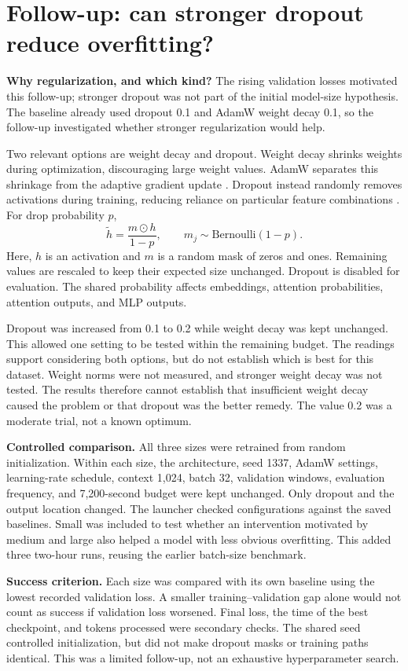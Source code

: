 \section{Follow-up: can stronger dropout reduce overfitting?}
\label{sec:dropoutdesign}
\textbf{Why regularization, and which kind?} The rising validation losses motivated this follow-up; stronger dropout was not part of the initial model-size hypothesis. The baseline already used dropout 0.1 and AdamW weight decay 0.1, so the follow-up investigated whether stronger regularization would help.

Two relevant options are weight decay and dropout. Weight decay shrinks weights during optimization, discouraging large weight values. AdamW separates this shrinkage from the adaptive gradient update \citep{loshchilov2019adamw}. Dropout instead randomly removes activations during training, reducing reliance on particular feature combinations \citep{srivastava2014dropout}. For drop probability $p$,
\begin{equation}
\widetilde h=\frac{m\odot h}{1-p},\qquad m_j\sim\mathrm{Bernoulli}(1-p).
\end{equation}
Here, $h$ is an activation and $m$ is a random mask of zeros and ones. Remaining values are rescaled to keep their expected size unchanged. Dropout is disabled for evaluation. The shared probability affects embeddings, attention probabilities, attention outputs, and MLP outputs.

Dropout was increased from 0.1 to 0.2 while weight decay was kept unchanged. This allowed one setting to be tested within the remaining budget. The readings support considering both options, but do not establish which is best for this dataset. Weight norms were not measured, and stronger weight decay was not tested. The results therefore cannot establish that insufficient weight decay caused the problem or that dropout was the better remedy. The value 0.2 was a moderate trial, not a known optimum.

\textbf{Controlled comparison.} All three sizes were retrained from random initialization. Within each size, the architecture, seed 1337, AdamW settings, learning-rate schedule, context 1,024, batch 32, validation windows, evaluation frequency, and 7,200-second budget were kept unchanged. Only dropout and the output location changed. The launcher checked configurations against the saved baselines. Small was included to test whether an intervention motivated by medium and large also helped a model with less obvious overfitting. This added three two-hour runs, reusing the earlier batch-size benchmark.

\textbf{Success criterion.} Each size was compared with its own baseline using the lowest recorded validation loss. A smaller training--validation gap alone would not count as success if validation loss worsened. Final loss, the time of the best checkpoint, and tokens processed were secondary checks. The shared seed controlled initialization, but did not make dropout masks or training paths identical. This was a limited follow-up, not an exhaustive hyperparameter search.
